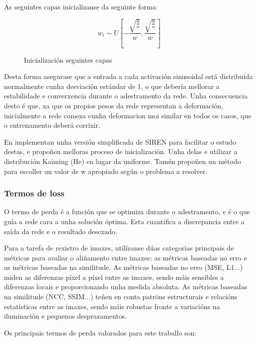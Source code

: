 As seguintes capas inicialízanse da seguinte forma:
\begin{figure}[ht!]
    \centering
    \[
    w_i \sim U\left[ -\frac{\sqrt{\frac{6}{n}}}{w}, \frac{\sqrt{\frac{6}{n}}}{w} \right]
    \]
    \caption{Inicialización seguintes capas}
\end{figure}

Desta forma asegurase que a entrada a cada activación sinusoidal está distribuída normalmente cunha desviación estándar de 1,
 o que debería mellorar a estabilidade e converxencia durante o adestramento da rede.
Unha consecuencia desto é que, xa que os propios pesos da rede representan a deformación, inicialmente a rede comeza cunha deformacion moi similar en todos os casos, que o entrenamento deberá corrixir.

En \cite{sireninit} implementan unha versión simplificada de SIREN para facilitar o estudo destas, 
e propoñen melloras proceso de inicialización. Unha delas e utilizar a distribución Kaiming (He) en lugar da uniforme.
Tamén propoñen un método para escoller un valor de w apropiado según o problema a resolver.

\subsubsection{Termos de loss}
\label{subsubsec:Termos de loss}

O termo de perda é a función que se optimiza durante o adestramento, e é o que guía a rede cara a unha solución óptima.
Esta cuantifica a discrepancia entre a saída da rede e o resultado desexado.

Para a tarefa de rexistro de imaxes, utilízanse dúas categorías principais de métricas para avaliar o aliñamento entre imaxes: 
as métricas baseadas no erro e as métricas baseadas na similitude. As métricas baseadas no erro (MSE, L1...) miden as diferenzas píxel a píxel entre as imaxes, 
sendo máis sensibles a diferenzas locais e proporcionando unha medida absoluta. 
As métricas baseadas na similitude (NCC, SSIM...) teñen en conta patróns estructurais e relacións estatísticas entre as imaxes, sendo máis robustas fronte a variacións na iluminación e pequenos desprazamentos.
\cite{simmetric}

Os principais termos de perda valorados para este traballo son:

